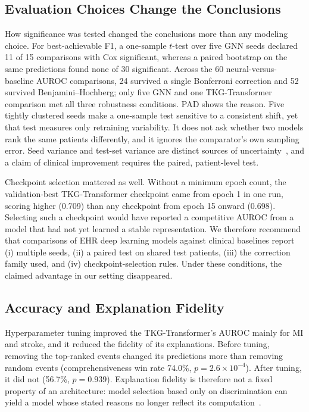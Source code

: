 \subsection{Evaluation Choices Change the Conclusions}
\label{sec:disc-eval}

How significance was tested changed the conclusions more than any modeling choice. For best-achievable F1, a one-sample $t$-test over five GNN seeds declared 11 of 15 comparisons with Cox significant, whereas a paired bootstrap on the same predictions found none of 30 significant. Across the 60 neural-versus-baseline AUROC comparisons, 24 survived a single Bonferroni correction and 52 survived Benjamini--Hochberg; only five GNN and one TKG-Transformer comparison met all three robustness conditions. PAD shows the reason. Five tightly clustered seeds make a one-sample test sensitive to a consistent shift, yet that test measures only retraining variability. It does not ask whether two models rank the same patients differently, and it ignores the comparator's own sampling error. Seed variance and test-set variance are distinct sources of uncertainty~\cite{bouthillier2021accounting}, and a claim of clinical improvement requires the paired, patient-level test.

Checkpoint selection mattered as well. Without a minimum epoch count, the validation-best TKG-Transformer checkpoint came from epoch 1 in one run, scoring higher (0.709) than any checkpoint from epoch 15 onward (0.698). Selecting such a checkpoint would have reported a competitive AUROC from a model that had not yet learned a stable representation. We therefore recommend that comparisons of EHR deep learning models against clinical baselines report (i) multiple seeds, (ii) a paired test on shared test patients, (iii) the correction family used, and (iv) checkpoint-selection rules. Under these conditions, the claimed advantage in our setting disappeared.

\subsection{Accuracy and Explanation Fidelity}
\label{sec:disc-fidelity}

Hyperparameter tuning improved the TKG-Transformer's AUROC mainly for MI and stroke, and it reduced the fidelity of its explanations. Before tuning, removing the top-ranked events changed its predictions more than removing random events (comprehensiveness win rate 74.0\%, $p=2.6\times10^{-4}$). After tuning, it did not (56.7\%, $p=0.939$).
Explanation fidelity is therefore not a fixed property of an architecture: model selection based only on discrimination can yield a model whose stated reasons no longer reflect its computation~\cite{jacovi2020towards}.

